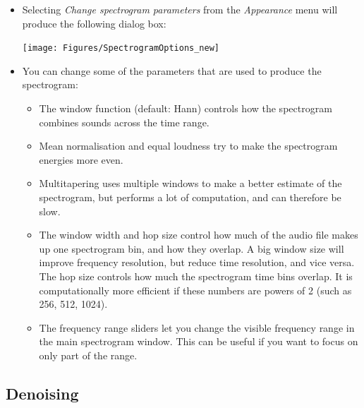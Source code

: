 \documentclass{scrartcl}
\begin{document}
\begin{itemize}
	\item Selecting \textit{Change spectrogram parameters} from the \textit{Appearance} menu will produce the following dialog box:

\begin{center}
    \texttt{[image: Figures/SpectrogramOptions\_new]}
\end{center}

\item You can change some of the parameters that are used to produce the spectrogram:

\begin{itemize}
\item The window function (default: Hann) controls how the spectrogram combines sounds across the time range. 
\item Mean normalisation and equal loudness try to make the spectrogram energies more even.
\item Multitapering uses multiple windows to make a better estimate of the spectrogram, but performs a lot of computation, and can therefore be slow.
\item The window width and hop size control how much of the audio file makes up one spectrogram bin, and how they overlap. A big window size will improve frequency resolution, but reduce time resolution, and vice versa. The hop size controls how much the spectrogram time bins overlap. It is computationally more efficient if these numbers are powers of 2 (such as 256, 512, 1024).
\item The frequency range sliders let you change the visible frequency range in the main spectrogram window. This can be useful if you want to focus on only part of the range.
\end{itemize}

\end{itemize}

\subsection{Denoising}\label{sec:denoising}
\end{document}
